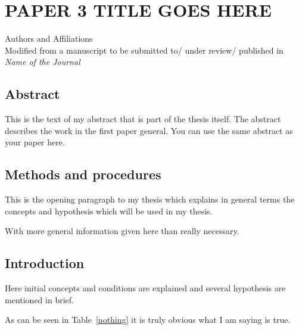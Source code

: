 \chapter{PAPER 3 TITLE GOES HERE}

\begin{center}
    Authors and Affiliations \\
    Modified from a manuscript to be submitted to/ under review/ published in \textit{Name of the Journal} 
\end{center}

\section{Abstract}
This is the text of my abstract that is part of the thesis itself.
The abstract describes the work in the first paper general. You can use the same abstract as your paper here.



\section{Methods and procedures}

This is the opening paragraph to my thesis which
explains in general terms the concepts and hypothesis
which will be used in my thesis.

With more general information given here than really
necessary.

\section{Introduction}

Here initial concepts and conditions are explained and
several hypothesis are mentioned in brief.

As can be seen in Table~\ref{nothing} it is truly
obvious what I am saying is true.

\begin{table}[h!tb] \centering
{}
\label{nothing}

\vspace{ 2 in}
\end{table}

